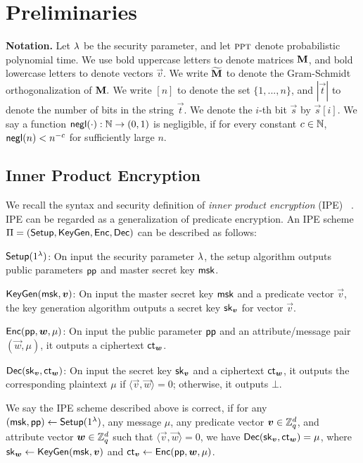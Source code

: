 
\section{Preliminaries}
\textbf{Notation.} Let $\lambda$ be the security parameter, and let $\textsc{ppt}$ denote probabilistic polynomial time. We use bold uppercase letters to denote matrices ${\bf M}$, and bold lowercase letters to denote vectors $\vec{v}$. We write $\widetilde{\mathbf{M}}$ to denote the Gram-Schmidt orthogonalization of $\mathbf{M}.$ We write $[n]$ to denote the set $\{1,...,n\}$, and $|\vec{t}|$ to denote the number of bits in the string $\vec{t}$. We denote the $i$-th bit $\vec{s}$ by $\vec{s}[i]$. We say a function $\mathsf{negl}(\cdot): \mathbb{N} \rightarrow (0,1)$ is negligible, if for every constant $c \in \mathbb{N}$, $\mathsf{negl}(n) < n^{-c}$ for sufficiently large $n$.

\subsection{Inner Product Encryption}
We recall the syntax and security definition of \emph{inner product encryption} (IPE) ~\cite{EC:KatSahWat08,AC:AgrFreVai11}. IPE can be regarded as a generalization of predicate encryption. An IPE scheme $\Pi = (\mathsf{Setup}, \mathsf{KeyGen}, \mathsf{Enc}, \mathsf{Dec})$ can be described as follows:
\begin{description}
 \item $\mathsf{Setup}(1^\lambda)$: On input the security parameter $\lambda$, the setup algorithm outputs public parameters $\mathsf{pp}$ and master secret key $\mathsf{msk}$.
 \item $\mathsf{KeyGen}(\mathsf{msk}, \boldsymbol{v})$: On input the master secret key $\mathsf{msk}$ and a predicate vector $\vec{v}$, the key generation algorithm outputs a secret key $\mathsf{sk}_{\boldsymbol{v}}$ for vector $\vec{v}$.
 \item $\mathsf{Enc}(\mathsf{pp}, \boldsymbol{w}, \mu)$: On input the public parameter $\mathsf{pp}$ and an attribute/message pair $(\vec{w}, \mu)$, it outputs a ciphertext $\mathsf{ct}_{\boldsymbol{w}}$.
 \item $\mathsf{Dec}(\mathsf{sk}_{\boldsymbol{v}}, \mathsf{ct}_{\boldsymbol{w}})$: On input the secret key $\mathsf{sk}_{\boldsymbol{v}}$ and a ciphertext $\mathsf{ct}_{\boldsymbol{w}}$, it outputs the corresponding plaintext $\mu$ if $\langle \vec{v}, \vec{w} \rangle = 0$; otherwise, it outputs $\bot$.
\end{description}

\begin{definition}[Correctness]\label{defn:cor}
We say the IPE scheme described above is correct, if for any $(\mathsf{msk}, \mathsf{pp}) \leftarrow \mathsf{Setup}(1^\lambda)$, any message $\mu$, any predicate vector $\boldsymbol{v} \in \mathbb{Z}_q^d$, and attribute vector $\boldsymbol{w} \in \mathbb{Z}_q^d$ such that $\langle \vec{v}, \vec{w}\rangle = 0$, we have $\mathsf{Dec}(\mathsf{sk}_{\boldsymbol{v}}, \mathsf{ct}_{\boldsymbol{w}}) = \mu$, where $\mathsf{sk}_{\boldsymbol{w}} \leftarrow \mathsf{KeyGen}(\mathsf{msk}, \boldsymbol{v})$ and $\mathsf{ct}_{\boldsymbol{v}} \leftarrow \mathsf{Enc}(\mathsf{pp}, \boldsymbol{w}, \mu)$.
\end{definition}

